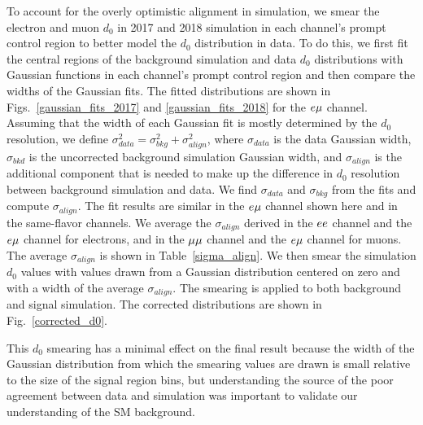 

To account for the overly optimistic alignment in simulation, we smear the electron and muon $d_0$ in 2017 and 2018 simulation in each channel's prompt control region to better model the $d_0$ distribution in data. To do this, we first fit the central regions of the background simulation and data $d_0$ distributions with Gaussian functions in each channel's prompt control region and then compare the widths of the Gaussian fits. The fitted distributions are shown in Figs.~\ref{gaussian_fits_2017} and \ref{gaussian_fits_2018} for the $e{\mu}$ channel. Assuming that the width of each Gaussian fit is mostly determined by the $d_0$ resolution, we define $\sigma_{data}^2 = \sigma_{bkg}^2 + \sigma_{align}^2$, where $\sigma_{data}$ is the data Gaussian width, $\sigma_{bkd}$ is the uncorrected background simulation Gaussian width, and $\sigma_{align}$ is the additional component that is needed to make up the difference in $d_0$ resolution between background simulation and data. We find $\sigma_{data}$ and $\sigma_{bkg}$ from the fits and compute $\sigma_{align}$. The fit results are similar in the $e{\mu}$ channel shown here and in the same-flavor channels. We average the $\sigma_{align}$ derived in the $ee$ channel and the $e{\mu}$ channel for electrons, and in the ${\mu}{\mu}$ channel and the $e{\mu}$ channel for muons. The average $\sigma_{align}$ is shown in Table~\ref{sigma_align}. We then smear the simulation $d_0$ values with values drawn from a Gaussian distribution centered on zero and with a width of the average $\sigma_{align}$. The smearing is applied to both background and signal simulation. The corrected \ad distributions are shown in Fig.~\ref{corrected_d0}.





This $d_0$ smearing has a minimal effect on the final result because the width of the Gaussian distribution from which the smearing values are drawn is small relative to the size of the signal region bins, but understanding the source of the poor agreement between data and simulation was important to validate our understanding of the SM background.


